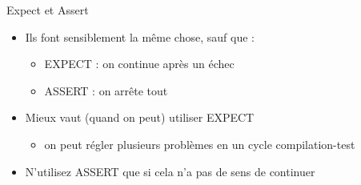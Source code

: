 \begin{frame}{Expect et Assert}

\begin{itemize}
\itemsep1pt\parskip0pt
\item
  Ils font sensiblement la même chose, sauf que :

  \begin{itemize}
  \itemsep1pt\parskip0pt
  \item
    EXPECT : on continue après un échec
  \item
    ASSERT : on arrête tout
  \end{itemize}
\item
  Mieux vaut (quand on peut) utiliser EXPECT

  \begin{itemize}
  \itemsep1pt\parskip0pt
  \item
    on peut régler plusieurs problèmes en un cycle compilation-test
  \end{itemize}
\item
  N'utilisez ASSERT que si cela n'a pas de sens de continuer
\end{itemize}

\end{frame}

